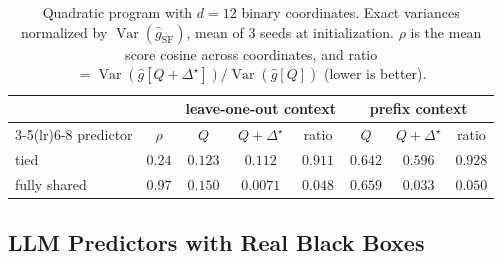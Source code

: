 \documentclass[10pt]{article}
\providecommand{\Var}{\operatorname{Var}}
\theoremstyle{plain}
\theoremstyle{definition}
\theoremstyle{remark}
\theoremstyle{definition}
\newcommand{\ghat}[1]{\hat g[#1]}            %
\newcommand{\rf}{\hat g_{\mathrm{SF}}}       %
\newcommand{\Dstar}{\Delta^{\star}}
\begin{document}
\begin{table}[t]
\centering\small
\caption{Quadratic program with $d=12$ binary coordinates. Exact variances normalized by $\Var(\rf)$, mean of $3$ seeds at initialization. $\rho$ is the mean score cosine across coordinates, and ratio $=\Var(\ghat{Q+\Dstar})/\Var(\ghat{Q})$ (lower is better).}
\label{tab:toy}
\begin{tabular}{lccccccc}
\toprule
& & \multicolumn{3}{c}{leave-one-out context} & \multicolumn{3}{c}{prefix context} \\
\cmidrule(lr){3-5}\cmidrule(lr){6-8}
predictor & $\rho$ & $Q$ & $Q{+}\Dstar$ & ratio & $Q$ & $Q{+}\Dstar$ & ratio \\
\midrule
tied & $0.24$ & $0.123$ & $0.112$ & $0.911$ & $0.642$ & $0.596$ & $0.928$ \\
fully shared & $0.97$ & $0.150$ & $0.0071$ & $\mathbf{0.048}$ & $0.659$ & $0.033$ & $\mathbf{0.050}$ \\
\bottomrule
\end{tabular}
\end{table}

\subsection{LLM Predictors with Real Black Boxes}\label{sec:mcp}
\end{document}
